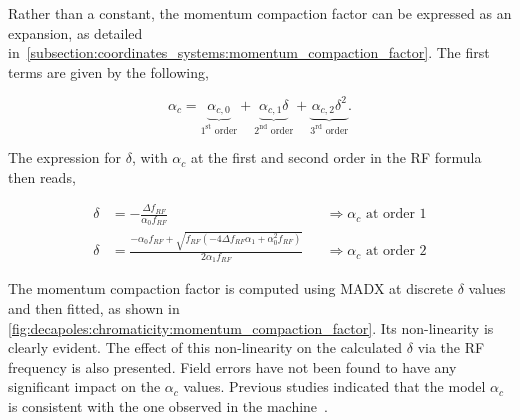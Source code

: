 \FloatBarrier
\subsubsection{}
\label{subsubsection:momentum_compaction_factor_studies}

Rather than a constant, the momentum compaction factor can be expressed as an
expansion, as detailed in~\cref{subsection:coordinates_systems:momentum_compaction_factor}.
The first terms are given by the following,

\begin{equation}
    \alpha_c = 
    \underbrace{\alpha_{c,0}}_{1^\text{st} \text{ order}}
    + \underbrace{\alpha_{c,1} \delta}_{2^\text{nd} \text{ order}}
    + \underbrace{\alpha_{c,2} \delta^2}_{3^\text{rd} \text{ order}}.
\end{equation}

The expression for $\delta$, with $\alpha_c$ at the first and second order in the RF formula then
reads,

\begin{equation}
    \begin{aligned}
        \delta &= -\frac{\Delta f_{RF}}{\alpha_{0} f_{RF}} && \Rightarrow \alpha_c \text{ at order 1} \\
        \delta &= \frac{- \alpha_{0} f_{RF} + \sqrt{f_{RF} 
            \left(- 4 \Delta f_{RF} \alpha_{1} + \alpha_{0}^{2} f_{RF}\right)}}{2 \alpha_{1} f_{RF}}
            && \Rightarrow \alpha_c \text{ at order 2} 
    \end{aligned}
\end{equation}

The momentum compaction factor is computed using MADX at discrete $\delta$ values and then fitted,
as shown in \cref{fig:decapoles:chromaticity:momentum_compaction_factor}. Its non-linearity is
clearly evident. The effect of this non-linearity on the calculated $\delta$ via the RF frequency is
also presented. Field errors have not been found to have any significant impact on the $\alpha_c$
values. Previous studies indicated that the model $\alpha_c$ is consistent with the one observed in
the machine~\cite{keintzel_momentum_2021}.

